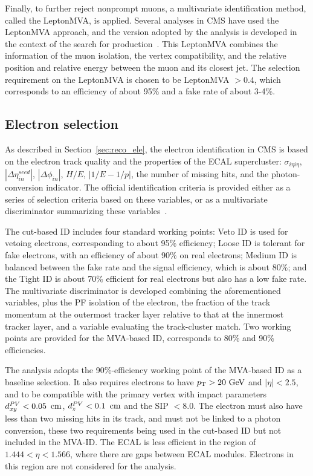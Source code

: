 Finally, to further reject nonprompt muons, a multivariate identification method, called the LeptonMVA, is applied.
Several analyses in CMS have used the LeptonMVA approach, and the version adopted by the \hmm analysis is developed in 
the context of the search for \tZq production~\cite{PhysRevLett.122.132003}.
This LeptonMVA combines the information of the muon isolation, the vertex compatibility, and the relative position and relative energy between the muon and its closest jet.
The selection requirement on the LeptonMVA is chosen to be LeptonMVA $> 0.4$, 
which corresponds to an efficiency of about 95\% and a fake rate of about 3-4\%. 

\subsection{Electron selection}\label{sec:sel_ele}

As described in Section~\ref{sec:reco_ele}, 
the electron identification in CMS is based on the electron track quality and the properties of the ECAL supercluster:
$\sigma_{i\eta{}i\eta}$,  $|\Delta\eta^{seed}_{in}|$, $|\Delta\phi_{in}|$, $H/E$, $|1/E-1/p|$, the number of missing hits, and the photon-conversion indicator. 
The official identification criteria is provided either as a series of selection criteria based on these variables, 
or as a multivariate discriminator summarizing these variables~\cite{cmscollaboration2020electron}.

The cut-based ID includes four standard working points: 
Veto ID is used for vetoing electrons, corresponding to about 95\% efficiency;
Loose ID is tolerant for fake electrons, with an efficiency of about 90\% on real electrons;
Medium ID is balanced between the fake rate and the signal efficiency, which is about 80\%;
and the Tight ID is about 70\% efficient for real electrons but also has a low fake rate.
The multivariate discriminator is developed combining the aforementioned variables, 
plus the PF isolation of the electron, the fraction of the track momentum at the outermost tracker layer relative to that at the innermost tracker layer, 
and a variable evaluating the track-cluster match.
Two working points are provided for the MVA-based ID, corresponds to 80\% and 90\% efficiencies.

The \hmm analysis adopts the 90\%-efficiency working point of the MVA-based ID as a baseline selection.
It also requires electrons to have $p_{\mathrm{T}} > 20~\mbox{GeV}$ and $|\eta| < 2.5$, 
and to be compatible with the primary vertex with impact parameters
$d^{PV}_{xy} < 0.05~\,\text{cm}$, $d^{PV}_{z} < 0.1~\,\text{cm}$ and the SIP $< 8.0$. 
The electron must also have less than two missing hits in its track, and must not be linked to a photon conversion,
these two requirements being used in the cut-based ID but not included in the MVA-ID.
The ECAL is less efficient in the region of $1.444 < \eta < 1.566$, where there are gaps between ECAL modules.
Electrons in this region are not considered for the analysis.

